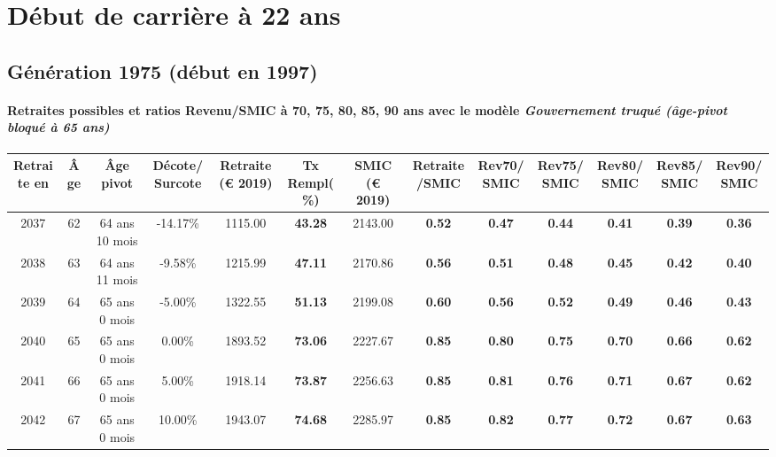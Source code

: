  \addto{\captionsenglish}{ \renewcommand{\mtctitle}{}} \setcounter{minitocdepth}{2} 
 \minitoc \newpage 

\section{Début de carrière à 22 ans} 

\subsection{Génération 1975 (début en 1997)} 

\paragraph{Retraites possibles et ratios Revenu/SMIC à 70, 75, 80, 85, 90 ans avec le modèle \emph{Gouvernement truqué (âge-pivot bloqué à 65 ans)}}  
 
{ \scriptsize \begin{center} 
\begin{tabular}[htb]{|c|c||c|c||c|c||c||c|c|c|c|c|c|} 
\hline 
 Retraite en &  Âge &  Âge pivot &  Décote/Surcote &  Retraite (\euro{} 2019) &  Tx Rempl(\%) &  SMIC (\euro{} 2019) &  Retraite/SMIC &  Rev70/SMIC &  Rev75/SMIC &  Rev80/SMIC &  Rev85/SMIC &  Rev90/SMIC \\ 
\hline \hline 
 2037 &  62 &  64 ans 10 mois &  -14.17\% &  1115.00 &  {\bf 43.28} &  2143.00 &  {\bf {\color{red} 0.52}} &  {\bf {\color{red} 0.47}} &  {\bf {\color{red} 0.44}} &  {\bf {\color{red} 0.41}} &  {\bf {\color{red} 0.39}} &  {\bf {\color{red} 0.36}} \\ 
\hline 
 2038 &  63 &  64 ans 11 mois &  -9.58\% &  1215.99 &  {\bf 47.11} &  2170.86 &  {\bf {\color{red} 0.56}} &  {\bf {\color{red} 0.51}} &  {\bf {\color{red} 0.48}} &  {\bf {\color{red} 0.45}} &  {\bf {\color{red} 0.42}} &  {\bf {\color{red} 0.40}} \\ 
\hline 
 2039 &  64 &  65 ans 0 mois &  -5.00\% &  1322.55 &  {\bf 51.13} &  2199.08 &  {\bf {\color{red} 0.60}} &  {\bf {\color{red} 0.56}} &  {\bf {\color{red} 0.52}} &  {\bf {\color{red} 0.49}} &  {\bf {\color{red} 0.46}} &  {\bf {\color{red} 0.43}} \\ 
\hline 
 2040 &  65 &  65 ans 0 mois &  0.00\% &  1893.52 &  {\bf 73.06} &  2227.67 &  {\bf {\color{red} 0.85}} &  {\bf {\color{red} 0.80}} &  {\bf {\color{red} 0.75}} &  {\bf {\color{red} 0.70}} &  {\bf {\color{red} 0.66}} &  {\bf {\color{red} 0.62}} \\ 
\hline 
 2041 &  66 &  65 ans 0 mois &  5.00\% &  1918.14 &  {\bf 73.87} &  2256.63 &  {\bf {\color{red} 0.85}} &  {\bf {\color{red} 0.81}} &  {\bf {\color{red} 0.76}} &  {\bf {\color{red} 0.71}} &  {\bf {\color{red} 0.67}} &  {\bf {\color{red} 0.62}} \\ 
\hline 
 2042 &  67 &  65 ans 0 mois &  10.00\% &  1943.07 &  {\bf 74.68} &  2285.97 &  {\bf {\color{red} 0.85}} &  {\bf {\color{red} 0.82}} &  {\bf {\color{red} 0.77}} &  {\bf {\color{red} 0.72}} &  {\bf {\color{red} 0.67}} &  {\bf {\color{red} 0.63}} \\ 
\hline 
\hline 
\end{tabular} 
\end{center} } 
